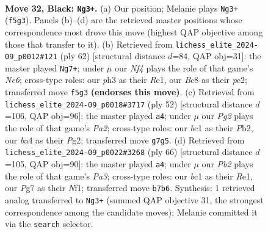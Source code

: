 \documentclass[11pt]{article}
\begin{document}
\clearpage

\begin{figure}[p]\centering
\begin{subfigure}{0.46\textwidth}\centering
\resizebox{\linewidth}{!}{%
\newchessgame
\chessboard[
  setfen={r1b5/ppp2ppk/7p/3qbn2/BQ6/5P1P/PP4P1/R1B4K b - - 5 32},
  showmover=false,
  pgfstyle=straightmove, color=movearrow, markmove={f5-g3}
]}
\caption{}
\end{subfigure}\hfill
\begin{subfigure}{0.46\textwidth}\centering
\resizebox{\linewidth}{!}{%
\newchessgame
\chessboard[
  setfen={4kr2/1p2b3/1qp1Np2/8/r2P3B/5Q1B/2p2PPP/4R1K1 w - - 0 32},
  showmover=false,
  pgfstyle=straightmove, color=movearrow, markmove={e6-g7}
]}
\caption{}
\end{subfigure}
\\[4pt]
\begin{subfigure}{0.46\textwidth}\centering
\resizebox{\linewidth}{!}{%
\newchessgame
\chessboard[
  setfen={2r3k1/1p3p1p/p5pq/4Pb2/3R1P2/1B4Q1/PPP3PP/1K6 w - - 1 27},
  showmover=false,
  pgfstyle=straightmove, color=movearrow, markmove={a2-a4}
]}
\caption{}
\end{subfigure}\hfill
\begin{subfigure}{0.46\textwidth}\centering
\resizebox{\linewidth}{!}{%
\newchessgame
\chessboard[
  setfen={r7/p2b2pk/1p1b3p/3P4/3Bp2q/PQP5/5PP1/4RNK1 w - - 0 34},
  showmover=false,
  pgfstyle=straightmove, color=movearrow, markmove={a3-a4}
]}
\caption{}
\end{subfigure}
\caption{\textbf{Move 32, Black: \texttt{Ng3+}.} (a) Our position; Melanie plays \texttt{Ng3+} (\texttt{f5g3}). Panels (b)--(d) are the retrieved master positions whose correspondence most drove this move (highest QAP objective among those that transfer to it). (b) Retrieved from \texttt{lichess\_elite\_2024-09\_p0012\#121} (ply 62) [structural distance $d$=84, QAP obj=31]: the master played \texttt{Ng7+}; under $\mu$ our \emph{Nf4} plays the role of that game's \emph{Ne6}; cross-type roles: our \emph{p}h3 as their \emph{R}e1, our \emph{B}c8 as their \emph{p}c2; transferred move \texttt{f5g3} \textbf{(endorses this move)}. (c) Retrieved from \texttt{lichess\_elite\_2024-09\_p0018\#3717} (ply 52) [structural distance $d$=106, QAP obj=96]: the master played \texttt{a4}; under $\mu$ our \emph{Pg2} plays the role of that game's \emph{Pa2}; cross-type roles: our \emph{b}c1 as their \emph{P}b2, our \emph{b}a4 as their \emph{P}g2; transferred move \texttt{g7g5}. (d) Retrieved from \texttt{lichess\_elite\_2024-09\_p0022\#3268} (ply 66) [structural distance $d$=105, QAP obj=90]: the master played \texttt{a4}; under $\mu$ our \emph{Pb2} plays the role of that game's \emph{Pa3}; cross-type roles: our \emph{b}c1 as their \emph{R}e1, our \emph{P}g7 as their \emph{N}f1; transferred move \texttt{b7b6}. Synthesis: 1 retrieved analog transferred to \texttt{Ng3+} (summed QAP objective 31, the strongest correspondence among the candidate moves); Melanie committed it via the \texttt{search} selector.}
\label{fig:thought-m63}
\end{figure}
\end{document}
